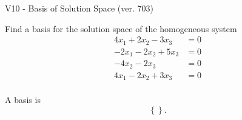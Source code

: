 \begin{exercise}
  \begin{exerciseTitle}V10 - Basis of Solution Space (ver. 703)\end{exerciseTitle}
  \begin{exerciseStatement}
    Find a basis for the solution space of the homogeneous system 
\begin{align*}
 4 x_ 1 + 2 x_ 2 -3 x_ 3 &= 0  \\ 
  -2 x_ 1 -2 x_ 2 + 5 x_ 3 &= 0  \\ 
  -4 x_ 2 -2 x_ 3 &= 0  \\ 
  4 x_ 1 -2 x_ 2 + 3 x_ 3 &= 0  \\ 
 \end{align*}


 
  \end{exerciseStatement}

  \begin{exerciseAnswer}
   A basis is   
\[\left\{\right\}.\]

  


  \end{exerciseAnswer}
\end{exercise}